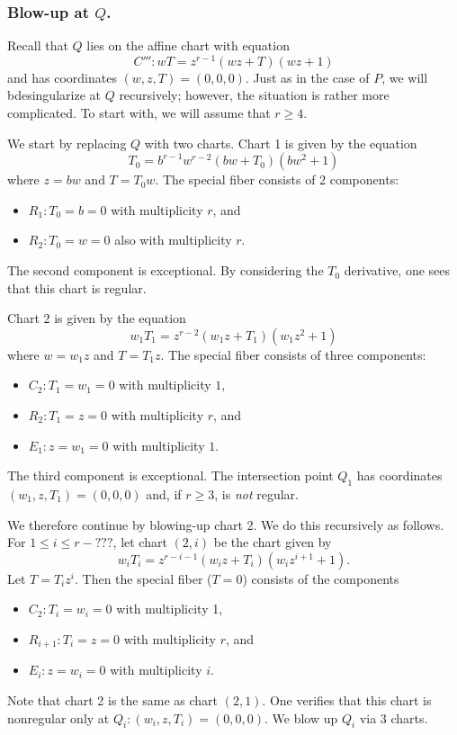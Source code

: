 \documentclass{article}
\theoremstyle{plain}
\theoremstyle{definition}
\theoremstyle{remark}
\begin{document}
\subsubsection{Blow-up at $Q$.}
\label{sec:blow-up-Q}

Recall that $Q$ lies on the affine chart with equation
\begin{equation}
  C''':wT = z^{r-1}(wz + T)(wz + 1)\label{eq:C'''}
\end{equation}
and has coordinates $(w,z,T) = (0,0,0)$. Just as in the case of $P$, we will bdesingularize at $Q$ recursively; however, the situation is rather more complicated. To start with, we will assume that $r \geq 4$.

We start by replacing $Q$ with two charts. Chart 1 is given by the equation
\[
T_0 = b^{r-1}w^{r-2}(bw + T_0)(bw^2 + 1)
\]
where $z = bw$ and $T = T_0w$. The special fiber consists of 2 components:
\begin{itemize}
    \item $R_1: T_0 = b = 0$ with multiplicity $r$, and
    \item $R_2: T_0 = w = 0$ also with multiplicity $r$.
\end{itemize}
 The second component is exceptional. By considering the $T_0$ derivative, one sees that this chart is regular.

Chart 2 is given by the equation
\[
w_1 T_1 = z^{r-2}(w_1z + T_1)(w_1 z^2 + 1)
\]
where $w = w_1 z$ and $T = T_1 z$. The special fiber consists of three components:
\begin{itemize}
    \item $C_2: T_1 = w_1 = 0$ with multiplicity $1$,
    \item $R_2: T_1 = z = 0$ with multiplicity $r$, and
    \item $E_1: z = w_1 = 0$ with multiplicity $1$.
\end{itemize}
The third component is exceptional. The intersection point $Q_1$ has coordinates $(w_1, z, T_1) = (0,0,0)$ and, if $r \geq 3$, is \emph{not} regular.

We therefore continue by blowing-up chart 2. We do this recursively as follows. For $1 \leq i \leq r-???$, let chart $(2,i)$ be the chart given by
  \[
  w_i T_i = z^{r-i-1} (w_i z + T_i) (w_i z^{i+1} + 1).
  \]
  Let $T = T_i z^i$. Then the special fiber ($T = 0$) consists of the components
  \begin{itemize}
      \item $C_2: T_i = w_i = 0$ with multiplicity 1,
      \item $R_{i+1}: T_i = z = 0$ with multiplicity $r$, and
      \item $E_i: z = w_i = 0$ with multiplicity $i$.
  \end{itemize}
  Note that chart 2 is the same as chart $(2,1)$. One verifies that this chart is nonregular only at $Q_i: (w_i, z, T_i) = (0, 0, 0)$. We blow up $Q_i$ via 3 charts.
\end{document}
